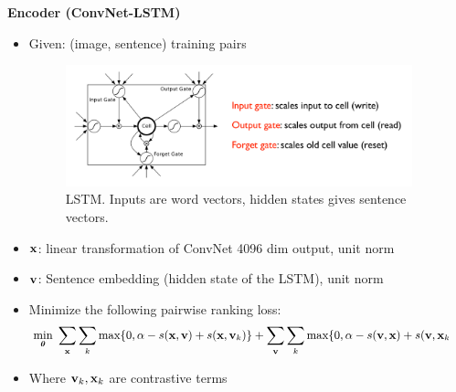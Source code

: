 \documentclass[serif,mathserif,final]{beamer}
\begin{document}
\begin{frame}{}
\begin{columns}[t]
\begin{column}{0.32\linewidth}
\begin{block}{\bf{\large Encoder (ConvNet-LSTM)}}  
  \begin{itemize}
    \item Given: (image, sentence) training pairs           
    \begin{figure}[t!]
      \vspace{-0.1in}
      \centering
      \includegraphics[width=0.9\columnwidth]{lstm}
      \vspace{-0.1in}
      \caption{LSTM. Inputs are word vectors, hidden states gives sentence vectors.} 
      \label{fig:annot}
    \end{figure}
    \item ${\bf x}$: linear transformation of ConvNet 4096 dim output, unit norm
    \item ${\bf v}$: Sentence embedding (hidden state of the LSTM), unit norm
    \item Minimize the following pairwise ranking loss:
    \begin{eqnarray}
    \small
    \underset{\boldsymbol\theta}{\operatorname{min}} \hspace{1mm}
    \label{eq:rank}
    \sum_{\bf x} \sum_k \text{max}\{0, \alpha - s({\bf x}, {\bf v}) + s({\bf x}, {\bf v}_k)\} 
    + \sum_{\bf v} \sum_k \text{max}\{0, \alpha - s({\bf v}, {\bf x}) + s({\bf v}, {\bf x}_k)\}, 
    \nonumber 
    \end{eqnarray}
    \item Where ${\bf v}_k, {\bf x}_k$ are contrastive terms
  \end{itemize}
\end{block}
\vfill
\endminipage
\end{column}

\begin{column}{0.32\linewidth}

\minipage[c][0.9\textheight][s]{\columnwidth}


\end{column}
\end{columns}
\end{frame}
\end{document}
